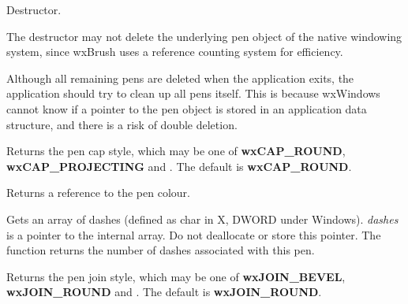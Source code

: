 

Destructor.


The destructor may not delete the underlying pen object of the native windowing
system, since wxBrush uses a reference counting system for efficiency.

Although all remaining pens are deleted when the application exits,
the application should try to clean up all pens itself. This is because
wxWindows cannot know if a pointer to the pen object is stored in an
application data structure, and there is a risk of double deletion.

\label{wxpengetcap}


Returns the pen cap style, which may be one of {\bf wxCAP\_ROUND}, {\bf wxCAP\_PROJECTING} and
. The default is {\bf wxCAP\_ROUND}.



\label{wxpengetcolour}


Returns a reference to the pen colour.



\label{wxpengetdashes}


Gets an array of dashes (defined as char in X, DWORD under Windows).
{\it dashes} is a pointer to the internal array. Do not deallocate or store this pointer.
The function returns the number of dashes associated with this pen.



\label{wxpengetjoin}


Returns the pen join style, which may be one of {\bf wxJOIN\_BEVEL}, {\bf wxJOIN\_ROUND} and
. The default is {\bf wxJOIN\_ROUND}.

